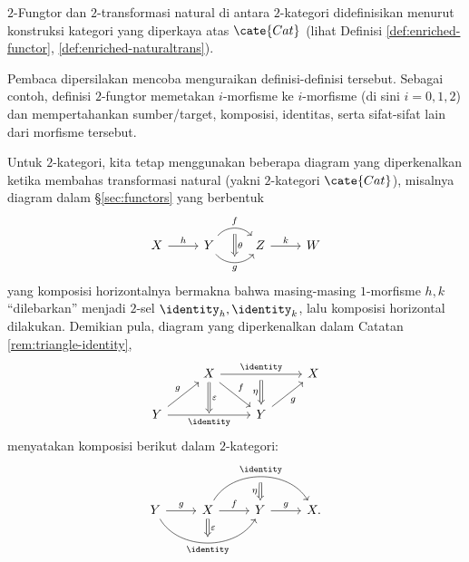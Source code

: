 \begin{definition}
	$2$-Fungtor dan $2$-transformasi natural di antara $2$-kategori didefinisikan menurut konstruksi kategori yang diperkaya atas $\cate{Cat}$ (lihat Definisi \ref{def:enriched-functor}, \ref{def:enriched-naturaltrans}).
\end{definition}
Pembaca dipersilakan mencoba menguraikan definisi-definisi tersebut. Sebagai contoh, definisi $2$-fungtor memetakan $i$-morfisme ke $i$-morfisme (di sini $i=0,1,2$) dan mempertahankan sumber/target, komposisi, identitas, serta sifat-sifat lain dari morfisme tersebut.

\begin{convention}
	Untuk $2$-kategori, kita tetap menggunakan beberapa diagram yang diperkenalkan ketika membahas transformasi natural (yakni $2$-kategori $\cate{Cat}$), misalnya diagram dalam \S\ref{sec:functors} yang berbentuk
	\[ \begin{tikzcd}
		X \arrow[r, "h"] & Y \arrow[bend left=50, r, "f", ""' name=U] \arrow[bend right=50, r, "" name=D, "g"'] & Z \arrow[Rightarrow, to path=(U)--(D) \tikztonodes, "\theta"] \arrow[r, "k"] & W
	\end{tikzcd} \]
	yang komposisi horizontalnya bermakna bahwa masing-masing $1$-morfisme $h, k$ ``dilebarkan'' menjadi $2$-sel $\identity_h, \identity_k$, lalu komposisi horizontal dilakukan. Demikian pula, diagram yang diperkenalkan dalam Catatan \ref{rem:triangle-identity},
	\[\begin{tikzcd}
		{} & X \arrow[rr, "\identity", ""' name=I] \arrow[rd, "f"] \arrow[Rightarrow, d, "\varepsilon"] & & X \\
		Y \arrow[ru, "g"] \arrow[rr, "" name=J, "\identity"'] & {} & Y \arrow[ru, "g"'] \arrow[Leftarrow, to path= -- (I) \tikztonodes, "\eta"] &
	\end{tikzcd} \]
	menyatakan komposisi berikut dalam $2$-kategori:
	\[ \begin{tikzcd}
		Y \arrow[r, "g"] \arrow[bend right=60, rr, "" name=J, "\identity"'] &
		X \arrow[r, "f"] \arrow[bend left=60, rr, "\identity", ""' name=I] \arrow[Rightarrow, to path= --(J) \tikztonodes, "\varepsilon"] &
		Y \arrow[r, "g"] \arrow[Leftarrow, to path= -- (I) \tikztonodes, "\eta"] &
		X .
	\end{tikzcd} \]
\end{convention}

